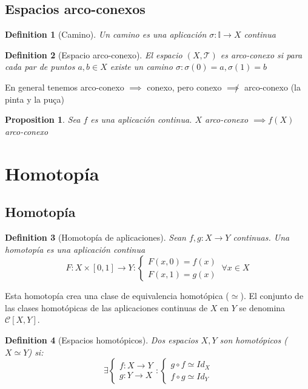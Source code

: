 \documentclass{myclass}
\newtheorem*{definition}{Definition}
\newtheorem*{proposition}{Proposition}
\begin{document}
\subsection{Espacios arco-conexos}
\begin{definition}[Camino] Un camino es una aplicación $\sigma :\mathbb{I} \to X$ continua
\end{definition}

\begin{definition}[Espacio arco-conexo] El espacio $(X, \mathcal{T})$ es arco-conexo si para cada par de puntos $a, b \in X$ existe un camino $\sigma : \sigma (0)=a, \sigma (1)=b$
\end{definition}

En general tenemos arco-conexo $\implies$ conexo, pero conexo $\not\implies$ arco-conexo (la pinta y la puça)

\begin{proposition}
Sea $f$ es una aplicación continua. $X$ arco-conexo  $\implies f(X)$ arco-conexo
\end{proposition}



\section{Homotopía}

\subsection{Homotopía}
\begin{definition}[Homotopía de aplicaciones]
  Sean $f, g: X \to Y$ continuas. Una homotopía es una aplicación continua 
  \[
  F:X\times [0, 1] \to  Y : \begin{cases}
    F(x, 0) = f(x) \\
	F(x, 1) = g(x)
  \end{cases} \ \forall x \in X
  \] 
\end{definition}

Esta homotopía crea una clase de equivalencia homotópica ($\simeq$). El conjunto de las clases homotópicas de las aplicaciones continuas de  $X$ en  $Y$ se denomina  $\mathcal{C}[X, Y]$.

\begin{definition}[Espacios homotópicos]
  Dos espacios $X, Y$ son homotópicos ($X\simeq Y$) si:
   \[
  \ \exists \begin{cases}
    f: X \to Y\\
    g: Y \to  X
  \end{cases}
  :
  \begin{cases}
    g\circ f \simeq Id_X \\
	f\circ g \simeq Id_Y
  \end{cases}
  \] 
\end{definition}
\end{document}
